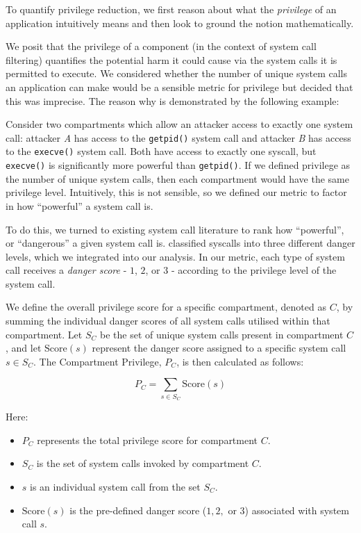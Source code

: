 To quantify privilege reduction, we first reason about what the 
\textit{privilege} of an application intuitively means and then look to ground
the notion mathematically.

We posit that the privilege of a component (in the context of system call
filtering) quantifies the potential harm it could cause via the system calls
it is permitted to execute. We considered whether the number of unique
system calls an application can make would be a sensible metric for privilege
but decided that this was imprecise. The reason why is
demonstrated by the following example:  

Consider two compartments which allow an attacker access to
exactly one system call: attacker \textit{A} has access to the 
\texttt{getpid()} system call and attacker \textit{B} has access to the
\texttt{execve()} system call. Both have access to exactly one syscall, but
\texttt{execve()} is significantly more powerful than \texttt{getpid()}.
If we defined privilege as the number of unique system calls, then each compartment
would have the same privilege level. Intuitively, this is not sensible, so we
defined our metric to factor in how ``powerful'' a system call is. 

To do this, we turned to existing system call literature to rank
how ``powerful'', or ``dangerous'' a given system call is. 
\textcite{SYSCALL_RANKINGS} classified syscalls into three different danger
levels, which we integrated into our analysis. In our metric, each type of
system call receives a \textit{danger score} - $1$, $2$, or $3$ - according
to the privilege level of the system call.

We define the overall privilege score for a specific compartment, denoted as
$C$, by summing the individual danger scores of all system calls utilised
within that compartment. Let $S_C$ be the set of unique system calls present
in compartment $C$, and let $\mathrm{Score}(s)$ represent the danger score
assigned to a specific system call $s \in S_C$. The Compartment Privilege, $P_C
$, is then calculated as follows:  

\begin{equation} \label{eqn:privilege} 
    P_C = \sum_{s \in S_C} \mathrm{Score}(s) 
\end{equation} 

Here:
\begin{itemize}
    \item $P_C$ represents the total privilege score for compartment $C$.
    \item $S_C$ is the set of system calls invoked by compartment $C$.
    \item $s$ is an individual system call from the set $S_C$.
    \item $\mathrm{Score}(s)$ is the pre-defined danger score ($1, 2,$ or $3$)
        associated with system call $s$.
\end{itemize}

